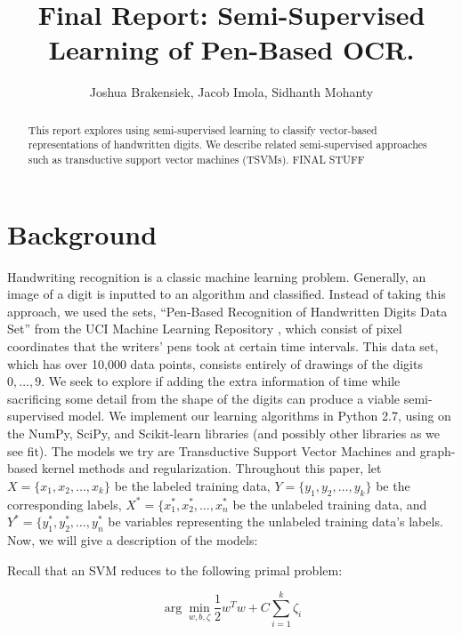 \documentclass[11pt]{article}
\title{Final Report: Semi-Supervised Learning of Pen-Based OCR.}
\author{Joshua Brakensiek, Jacob Imola, Sidhanth Mohanty}
\begin{document}
\maketitle

\begin{abstract}

  This report explores using semi-supervised learning to classify vector-based representations of handwritten digits. We describe related semi-supervised approaches such as transductive support vector machines (TSVMs). FINAL STUFF

\end{abstract}



\newcommand{\Seq}{\operatorname{Seq}}

\section{Background}

Handwriting recognition is a classic machine learning problem. Generally, an image of a digit is inputted to an algorithm and classified. Instead of taking this approach, we used the sets,  ``Pen-Based Recognition of Handwritten Digits Data Set'' \cite{Alpaydin:1998} from the UCI Machine Learning Repository \cite{Lichman:2013}, which consist of pixel coordinates that the writers' pens took at certain time intervals. This data set, which has over 10,000 data points, consists entirely of drawings of the digits $0, \hdots, 9$. We seek to explore if adding the extra information of time while sacrificing some detail from the shape of the digits can produce a viable semi-supervised model.  We implement our learning algorithms in Python 2.7, using on the NumPy, SciPy, and Scikit-learn libraries (and possibly other libraries as we see fit). The models we try are Transductive Support Vector Machines and graph-based kernel methods and regularization. Throughout this paper, let $X = \{x_1, x_2, \ldots, x_k\}$ be the labeled training data, $Y = \{y_1, y_2, \ldots, y_k\}$ be the corresponding labels, $X^* = \{x^*_1, x^*_2, \ldots, x^*_n$ be the unlabeled training data, and $Y^* = \{y^*_1, y^*_2, \ldots, y^*_n$ be variables representing the unlabeled training data's labels. Now, we will give a description of the models: \par

Recall that an SVM reduces to the following primal problem:

\begin{equation}\label{eq:1}
\arg\min_{w, b, \zeta} \frac{1}{2}w^Tw+C\sum_{i=1}^k\zeta_i
\end{equation}
\end{document}
